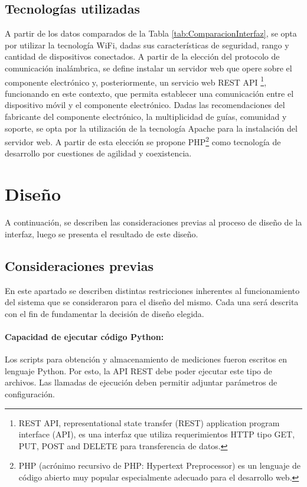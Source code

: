         \subsection{Tecnologías utilizadas}
            A partir de los datos comparados de la Tabla \ref{tab:ComparacionInterfaz}, se opta por utilizar la tecnología WiFi, dadas sus características de seguridad, rango y cantidad de dispositivos conectados. A partir de la elección del protocolo de comunicación inalámbrica, se define instalar un servidor web que opere sobre el componente electrónico y, posteriormente, un servicio web REST API \footnote{REST API, representational state transfer (REST) application program interface (API), es una interfaz que utiliza requerimientos HTTP tipo GET, PUT, POST and DELETE para transferencia de datos.}, funcionando en este contexto, que permita establecer una comunicación entre el dispositivo móvil y el componente electrónico. Dadas las recomendaciones del fabricante del componente electrónico, la multiplicidad de guías, comunidad y soporte, se opta por la utilización de la tecnología Apache para la instalación del servidor web. A partir de esta elección se propone PHP\footnote{PHP (acrónimo recursivo de PHP: Hypertext Preprocessor) es un lenguaje de código abierto muy popular especialmente adecuado para el desarrollo web.} como tecnología de desarrollo por cuestiones de agilidad y coexistencia.
            
    \section{Diseño}
    A continuación, se describen las consideraciones previas al proceso de diseño de la interfaz, luego se presenta el resultado de este diseño.
        
        \subsection{Consideraciones previas}
            \par En este apartado se describen distintas restricciones inherentes al funcionamiento del sistema que se consideraron para el diseño del mismo. Cada una será descrita con el fin de fundamentar la decisión de diseño elegida.

            \paragraph{Capacidad de ejecutar código Python:}
                \par Los scripts para obtención y almacenamiento de mediciones fueron escritos en lenguaje Python. Por esto, la API REST debe poder ejecutar este tipo de archivos. Las llamadas de ejecución deben permitir adjuntar parámetros de configuración.
        
